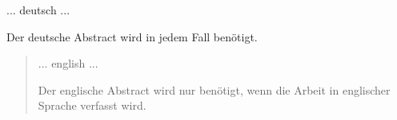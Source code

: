 

\begin{abstractgerman}
... deutsch ...

Der deutsche Abstract wird in jedem Fall benötigt.
\clearpage
\end{abstractgerman}
\newpage

\begin{abstract}
\label{sec:abstract}
... english ...

Der englische Abstract wird nur benötigt, wenn die Arbeit in englischer Sprache verfasst wird.
\clearpage
\end{abstract}
